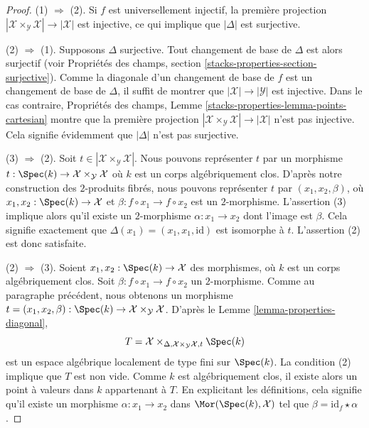 \begin{proof}
(1) $\Rightarrow$ (2). Si $f$ est universellement injectif, la première
projection
$|\mathcal{X} \times_\mathcal{Y} \mathcal{X}| \to |\mathcal{X}|$
est injective, ce qui implique que $|\Delta|$ est surjective.

\medskip\noindent
(2) $\Rightarrow$ (1). Supposons $\Delta$ surjective. Tout changement
de base de $\Delta$ est alors surjectif (voir Propriétés des champs, section
\ref{stacks-properties-section-surjective}).
Comme la diagonale d'un changement de base de $f$ est un changement
de base de $\Delta$, il suffit de montrer que
$|\mathcal{X}| \to |\mathcal{Y}|$ est injective.
Dans le cas contraire, Propriétés des champs, Lemme
\ref{stacks-properties-lemma-points-cartesian}
montre que la première projection
$|\mathcal{X} \times_\mathcal{Y} \mathcal{X}| \to |\mathcal{X}|$
n'est pas injective. Cela signifie évidemment que $|\Delta|$ n'est
pas surjective.

\medskip\noindent
(3) $\Rightarrow$ (2). Soit
$t \in |\mathcal{X} \times_\mathcal{Y} \mathcal{X}|$.
Nous pouvons représenter $t$ par un morphisme
$t : \Spec(k) \to \mathcal{X} \times_\mathcal{Y} \mathcal{X}$
où $k$ est un corps algébriquement clos.
D'après notre construction des $2$-produits fibrés, nous pouvons
représenter $t$ par $(x_1, x_2, \beta)$, où
$x_1, x_2 : \Spec(k) \to \mathcal{X}$ et
$\beta : f \circ x_1 \to f \circ x_2$ est un $2$-morphisme.
L'assertion (3) implique alors qu'il existe un $2$-morphisme
$\alpha : x_1 \to x_2$ dont l'image est $\beta$.
Cela signifie exactement que $\Delta(x_1) = (x_1, x_1, \text{id})$
est isomorphe à $t$. L'assertion (2) est donc satisfaite.

\medskip\noindent
(2) $\Rightarrow$ (3). Soient
$x_1, x_2 : \Spec(k) \to \mathcal{X}$ des morphismes, où $k$ est un
corps algébriquement clos. Soit
$\beta : f \circ x_1 \to f \circ x_2$ un $2$-morphisme.
Comme au paragraphe précédent, nous obtenons un morphisme
$t = (x_1, x_2, \beta) :
\Spec(k) \to \mathcal{X} \times_\mathcal{Y} \mathcal{X}$.
D'après le Lemme \ref{lemma-properties-diagonal},
$$
T = \mathcal{X}
\times_{\Delta, \mathcal{X} \times_\mathcal{Y} \mathcal{X}, t} \Spec(k)
$$
est un espace algébrique localement de type fini sur $\Spec(k)$.
La condition (2) implique que $T$ est non vide. Comme $k$ est
algébriquement clos, il existe alors un point à valeurs dans $k$
appartenant à $T$.
En explicitant les définitions, cela signifie qu'il existe un morphisme
$\alpha : x_1 \to x_2$ dans $\Mor(\Spec(k), \mathcal{X})$
tel que $\beta = \text{id}_f \star \alpha$.
\end{proof}

